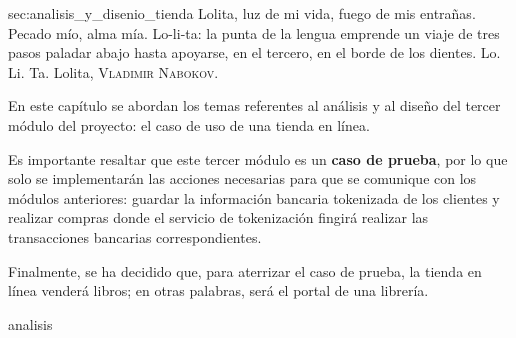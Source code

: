 %
%

   {sec:analisis_y_disenio_tienda}
{
  \epigrafe
  {%
    Lolita, luz de mi vida, fuego de mis entrañas. Pecado mío, alma mía.
    Lo-li-ta: la punta de la lengua emprende un viaje de tres pasos paladar
    abajo hasta apoyarse, en el tercero, en el borde de los dientes.
    Lo. Li. Ta.%
  }
  {%
    Lolita,
    \textsc{Vladimir Nabokov}.%
  }
}

\noindent
En este capítulo se abordan los temas referentes al análisis y al diseño del
tercer módulo del proyecto: el caso de uso de una tienda en línea.

Es importante resaltar que este tercer módulo es un \textbf{caso de prueba},
por lo que solo se implementarán las acciones necesarias para que se comunique
con los módulos anteriores: guardar la información bancaria tokenizada de los
clientes y realizar compras donde el servicio de tokenización fingirá realizar
las transacciones bancarias correspondientes.

Finalmente, se ha decidido que, para aterrizar el caso de prueba, la tienda en
línea venderá libros; en otras palabras, será el portal de una librería.

{analisis}
